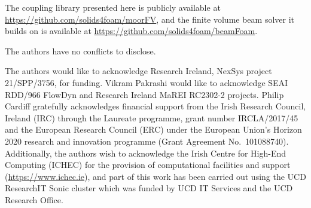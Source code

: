 \documentclass[sn-mathphys,Numbered]{sn-jnl}%
\begin{document}








\backmatter

\noindent
The coupling library presented here is publicly available at
\url{https://github.com/solids4foam/moorFV}, and the finite volume beam solver it builds on
is available at \url{https://github.com/solids4foam/beamFoam}.

\noindent
The authors have no conflicts to disclose.

\noindent
The authors would like to acknowledge Research Ireland, NexSys project 21/SPP/3756, for
funding. Vikram Pakrashi would like to acknowledge SEAI RDD/966 FlowDyn and Research
Ireland MaREI RC2302-2 projects. Philip Cardiff gratefully acknowledges financial support
from the Irish Research Council, Ireland (IRC) through the Laureate programme, grant
number IRCLA/2017/45 and the European Research Council (ERC) under the European
Union's Horizon 2020 research and innovation programme (Grant Agreement No.\ 101088740).
Additionally, the authors wish to acknowledge the Irish Centre for High-End Computing
(ICHEC) for the provision of computational facilities and support
(\url{https://www.ichec.ie}), and part of this work has been carried out using the UCD
ResearchIT Sonic cluster which was funded by UCD IT Services and the UCD Research Office.


\end{document}
